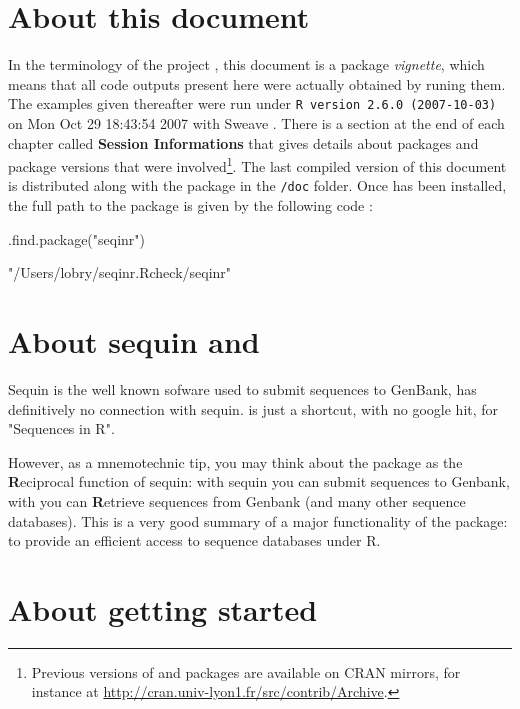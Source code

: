 \documentclass{article}
\begin{document}
\section{About this document}

In the terminology of the \Rlogo{} project \cite{R, RfromR}, this document 
is a package \emph{vignette}, which means that all code outputs present 
here were actually obtained by runing them.
The examples given thereafter were run under \texttt{R version 2.6.0 (2007-10-03)}
on Mon Oct 29 18:43:54 2007 with Sweave \cite{Sweave}. There is a section at the end of
each chapter called \textbf{Session Informations} that gives details about
packages and package versions that were involved\footnote{
Previous versions of \Rlogo{} and packages are available on CRAN mirrors,
for instance at \url{http://cran.univ-lyon1.fr/src/contrib/Archive}.
}.
The last compiled version of this document is distributed along with the \seqinr{}
package in the \texttt{/doc} folder. Once \seqinr{} has been installed, the
full path to the package is given by the following \Rlogo{} code :

\begin{Schunk}
\begin{Sinput}
 .find.package("seqinr")
\end{Sinput}
\begin{Soutput}
[1] "/Users/lobry/seqinr.Rcheck/seqinr"
\end{Soutput}
\end{Schunk}


\section{About sequin and \seqinr{}}

Sequin is the well known sofware used to submit sequences to GenBank, \seqinr{}
\cite{seqinr} has definitively no connection with sequin. \seqinr{} is just a shortcut, with
no google hit, for "Sequences in R".

However, as a mnemotechnic tip, you may think about the \seqinr{} package
as the {\bf{R}}eciprocal function of sequin: with sequin you can submit sequences
to Genbank, with \seqinr{} you can {\bf{R}}etrieve sequences from Genbank
(and many other sequence databases). This is
a very good summary of a major functionality of the \seqinr{} package: to
provide an efficient access to sequence databases under R.

\section{About getting started}
\end{document}
